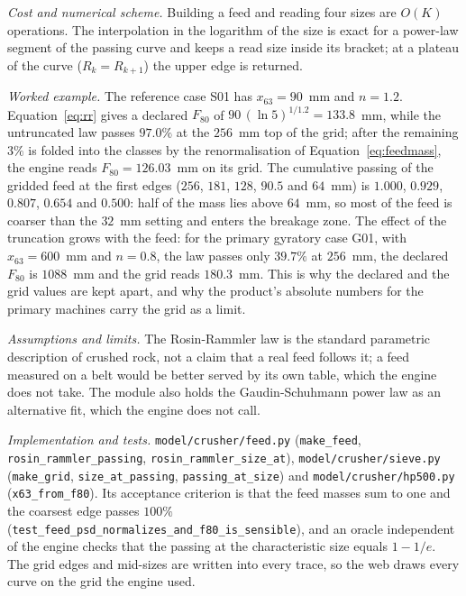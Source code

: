 \emph{Cost and numerical scheme.} Building a feed and reading four sizes are $O(K)$ operations. The interpolation in the logarithm
of the size is exact for a power-law segment of the passing curve and keeps a read size inside its bracket; at a plateau of the curve
($R_k=R_{k+1}$) the upper edge is returned.

\emph{Worked example.} The reference case S01 has $x_{63}=90$~mm and $n=1.2$. Equation~\eqref{eq:rr} gives a declared $F_{80}$ of
$90\,(\ln5)^{1/1.2}=133.8$~mm, while the untruncated law passes $97.0\%$ at the $256$~mm top of the grid; after the remaining $3\%$ is folded
into the classes by the renormalisation of Equation~\eqref{eq:feedmass}, the engine reads $F_{80}=126.03$~mm on its grid. The cumulative
passing of the gridded feed at the first edges ($256$, $181$, $128$, $90.5$ and $64$~mm) is $1.000$, $0.929$, $0.807$, $0.654$ and $0.500$: half
of the mass lies above $64$~mm, so most of the feed is coarser than the $32$~mm setting and enters the breakage zone. The effect of the
truncation grows with the feed: for the primary gyratory case G01, with $x_{63}=600$~mm and $n=0.8$, the law passes only $39.7\%$ at
$256$~mm, the declared $F_{80}$ is $1088$~mm and the grid reads $180.3$~mm. This is why the declared and the grid values are kept apart, and
why the product's absolute numbers for the primary machines carry the grid as a limit.

\emph{Assumptions and limits.} The Rosin-Rammler law is the standard parametric description of crushed rock, not a claim that a real
feed follows it; a feed measured on a belt would be better served by its own table, which the engine does not take. The module also
holds the Gaudin-Schuhmann power law as an alternative fit, which the engine does not call.

\emph{Implementation and tests.} \texttt{model/\allowbreak{}crusher/\allowbreak{}feed.py} (\texttt{make\_feed}, \texttt{rosin\_rammler\_passing},
\texttt{rosin\_rammler\_size\_at}), \texttt{model/\allowbreak{}crusher/\allowbreak{}sieve.py} (\texttt{make\_grid}, \texttt{size\_at\_passing},
\texttt{passing\_at\_size}) and \texttt{model/\allowbreak{}crusher/\allowbreak{}hp500.py} (\texttt{x63\_from\_f80}). Its acceptance criterion is that the
feed masses sum to one and the coarsest edge passes $100\%$ (\texttt{test\_feed\_psd\_normalizes\_and\_f80\_is\_sensible}), and an
oracle independent of the engine checks that the passing at the characteristic size equals $1-1/e$. The grid edges and mid-sizes are
written into every trace, so the web draws every curve on the grid the engine used.


